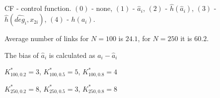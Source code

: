 \begin{table}
\begin{threeparttable}
\begin{tablenotes}\tiny 
\item CF - control function. $(0)$ - none, $(1)$ - $\hat{a}_i$,  $(2)$ - $\hat{h}(\hat{a}_i)$, $(3)$ - $\hat{h}(\widehat{deg}_i,x_{2i})$, $(4)$ - $h(a_i)$. 
\item Average number of links for $N=100$ is $24.1$, for $N=250$ it is $60.2$. 
\item The bias of $\hat{a}_i$ is calculated as $a_i-\hat{a}_i$ 
\item $K^*_{100,0.2}=3$, $K^*_{100,0.5}=5$, $K^*_{100,0.8}=4$ 
\item $K^*_{250,0.2}=8$, $K^*_{250,0.5}=3$, $K^*_{250,0.8}=8$ 
  \end{tablenotes} 
\end{threeparttable} 
\end{table} 
